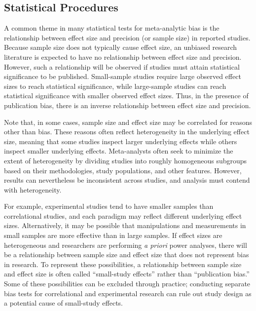 \documentclass[man, mask]{apa6}
\begin{document}
\subsection{Statistical Procedures}
A common theme in many statistical tests for meta-analytic bias is the relationship between effect size and precision (or sample size) in reported studies. Because sample size does not typically cause effect size, an unbiased research literature is expected to have no relationship between effect size and precision. However, such a relationship will be observed if studies must attain statistical significance to be published. Small-sample studies require large observed effect sizes to reach statistical significance, while large-sample studies can reach statistical significance with smaller observed effect sizes. Thus, in the presence of publication bias, there is an inverse relationship between effect size and precision. 

Note that, in some cases, sample size and effect size may be correlated for reasons other than bias. These reasons often reflect heterogeneity in the underlying effect size, meaning that some studies inspect larger underlying effects while others inspect smaller underlying effects. Meta-analysts often seek to minimize the extent of heterogeneity by dividing studies into roughly homogeneous subgroups based on their methodologies, study populations, and other features. However, results can nevertheless be inconsistent across studies, and analysis must contend with heterogeneity.

For example, experimental studies tend to have smaller samples than correlational studies, and each paradigm may reflect different underlying effect sizes. Alternatively, it may be possible that manipulations and measurements in small samples are more effective than in large samples. If effect sizes are heterogeneous and researchers are performing {\em a priori} power analyses, there will be a relationship between sample size and effect size that does not represent bias in research.
To represent these possibilities, a relationship between sample size and effect size is often called ``small-study effects'' rather than ``publication bias.'' Some of these possibilities can be excluded through practice; conducting separate bias tests for correlational and experimental research can rule out study design as a potential cause of small-study effects.
\end{document}
